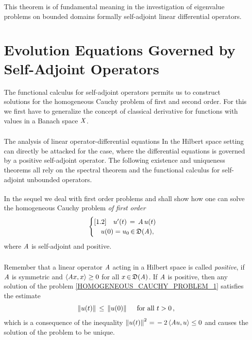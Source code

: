 \documentclass[11pt,twoside]{article}
\begin{document}
\subparagraph*{}
This theorem is of fundamental meaning in the investigation of eigenvalue
problems on bounded domains {\wrt} formally self-adjoint 
linear differential operators.

\section{Evolution Equations Governed by Self-Adjoint Operators}
The functional calculus for self-adjoint operators permits us to construct
solutions for the homogeneous Cauchy problem of first and second order.
For this we first have to generalize the concept of classical derivative
for functions with values in a Banach space $\mathit{X}$.

\subsubsection*{} %
The analysis of linear operator-differential equations
In the Hilbert space setting
can directly be attacked for the case,
where the differential equations is governed
by a positive self-adjoint operator.
The following existence and uniqueness theorems all rely on the spectral
theorem and the functional calculus for self-adjoint unbounded operators.

\paragraph*{}
In the sequel we deal with first order problems and shall show
how one can solve the homogeneous Cauchy problem \textit{of first order}
\begin{equation}\label{HOMOGENEOUS_CAUCHY_PROBLEM_1}
\begin{cases}[1.2]
\quad u'(t) \,=\, \mathit{A} \, u(t) \\
\quad u(0)=u_0 {\,\in\,} \mathfrak{D}(\mathit{A}), \\
\end{cases}
\end{equation}
where $\mathit{A}$ is self-adjoint and positive.

\subparagraph*{}
Remember that a linear operator $\mathit{A}$ acting in a Hilbert space
is called \textit{positive},
if $\mathit{A}$ is symmetric and $\langle \mathit{A} x,x \rangle \geq 0$
for all $x {\,\in\,} \mathfrak{D}(\mathit{A})$.
If $\mathit{A}$ is positive,
then any solution of the problem \eqref{HOMOGENEOUS_CAUCHY_PROBLEM_1}
satisfies the estimate
\begin{equation}\label{ESTIMATION_FOR_NONNEGATIVE_OPERATOR}
\left\lVert u(t) \right\rVert \, \leq \, \left\lVert u(0) \right\rVert
\quad \mbox{ for all } t > 0\,,
\end{equation}
which is a consequence of the inequality
$\left\lVert u(t) \right\rVert^2 {\,=\,} - 2 \, \langle \mathit{A} u,u \rangle \leq 0$
and causes the solution of the problem to be unique.
\end{document}
